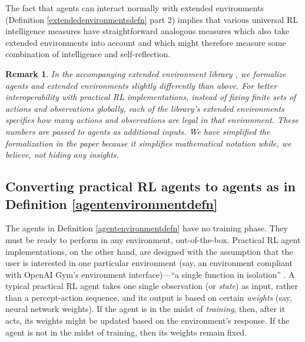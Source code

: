 \documentclass{article}
\newtheorem{myremark}[mytheorem]{Remark}
\begin{document}
The fact that agents can interact normally with extended environments
(Definition \ref{extendedenvironmentsdefn} part 2) implies that various universal
RL intelligence measures
\cite{goertzel2006patterns} \cite{hernandez} \cite{gavane} \cite{legg2007universal}
have straightforward analogous measures which also take
extended environments into account and which might therefore measure some combination
of intelligence and self-reflection.

\begin{myremark}
  In the accompanying extended environment library \cite{library}, we formalize agents
  and extended environments slightly differently than above.
  For better interoperability
  with practical RL implementations, instead of fixing finite
  sets of actions and observations globally, each of the library's extended environments
  specifies how many actions and observations are legal in that environment.
  These numbers are passed to agents as additional inputs.
  We have simplified the formalization in the paper because it simplifies
  mathematical notation while, we believe, not hiding any insights.
\end{myremark}

\subsection{Converting practical RL agents to agents as in
Definition \ref{agentenvironmentdefn}}
\label{mappingtouniversalsection}

The agents in Definition \ref{agentenvironmentdefn} have no training phase. They must be
ready to perform in any environment, out-of-the-box. Practical RL agent implementations,
on the other hand, are designed with the assumption that the user is interested in one
particular environment (say, an environment compliant with OpenAI Gym's
environment interface)---``a single function in isolation'' \cite{thrun1998lifelong}.
A typical practical RL agent takes one single observation (or
\emph{state}) as input, rather than a percept-action sequence, and its output is based
on certain \emph{weights} (say, neural network weights). If the agent is in the midst of
\emph{training}, then, after it acts, its weights might be updated based on the environment's
response. If the agent is not in the midst of training, then its weights remain fixed.
\end{document}
